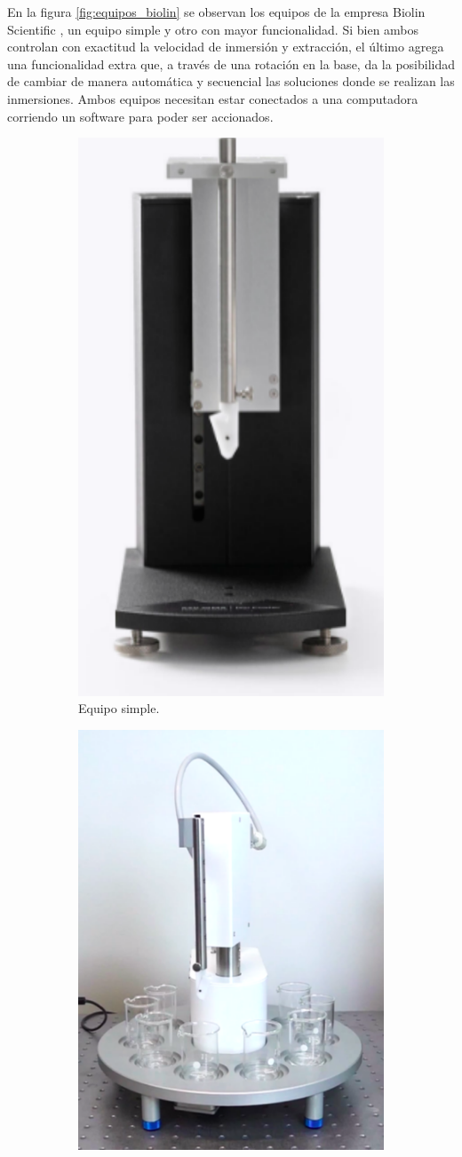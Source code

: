 En la figura \ref{fig:equipos_biolin} se observan los equipos de la empresa Biolin Scientific  \citep{1_web_biolin}, un equipo simple y otro con mayor funcionalidad. Si bien ambos controlan con exactitud la velocidad de inmersión y extracción, el último agrega una funcionalidad extra que, a través de una rotación en la base, da la posibilidad de cambiar de manera automática y secuencial las soluciones donde se realizan las inmersiones. Ambos equipos necesitan estar conectados a una computadora corriendo un software para poder ser accionados.

\begin{figure}[!htpb]
     \centering
     \begin{subfigure}[b]{0.4\textwidth}
         \centering
         \includegraphics[width=.45\textwidth]{./Figures/dip_biolin.pdf}
         \caption{Equipo simple.}
         \label{fig:dip_biolin}
     \end{subfigure}
     \hfill
     \begin{subfigure}[b]{0.4\textwidth}
         \centering
         \includegraphics[width=.65\textwidth]{./Figures/dip_biolin_2.pdf}

\end{subfigure}
\end{figure}
